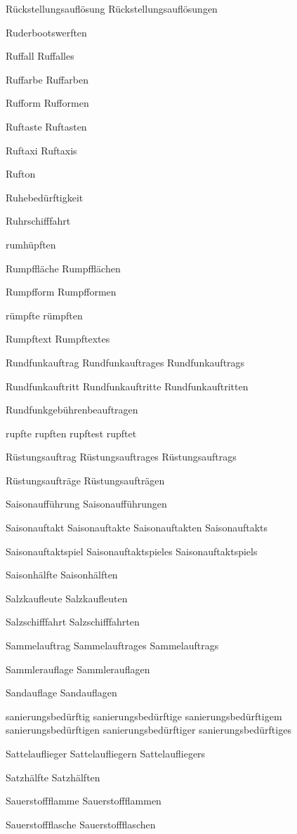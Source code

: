 Rückstellungsauflösung
Rückstellungsauflösungen

Ruderbootswerften

Ruffall
Ruffalles

Ruffarbe
Ruffarben

Rufform
Rufformen

Ruftaste
Ruftasten

Ruftaxi
Ruftaxis

Rufton

Ruhebedürftigkeit

Ruhrschifffahrt

rumhüpften

Rumpffläche
Rumpfflächen

Rumpfform
Rumpfformen

rümpfte
rümpften

Rumpftext
Rumpftextes

Rundfunkauftrag
Rundfunkauftrages
Rundfunkauftrags

Rundfunkauftritt
Rundfunkauftritte
Rundfunkauftritten

Rundfunkgebührenbeauftragen

rupfte
rupften
rupftest
rupftet

Rüstungsauftrag
Rüstungsauftrages
Rüstungsauftrags

Rüstungsaufträge
Rüstungsaufträgen

Saisonaufführung
Saisonaufführungen

Saisonauftakt
Saisonauftakte
Saisonauftakten
Saisonauftakts

Saisonauftaktspiel
Saisonauftaktspieles
Saisonauftaktspiels

Saisonhälfte
Saisonhälften

Salzkaufleute
Salzkaufleuten

Salzschifffahrt
Salzschifffahrten

Sammelauftrag
Sammelauftrages
Sammelauftrags

Sammlerauflage
Sammlerauflagen

Sandauflage
Sandauflagen

sanierungsbedürftig
sanierungsbedürftige
sanierungsbedürftigem
sanierungsbedürftigen
sanierungsbedürftiger
sanierungsbedürftiges

Sattelauflieger
Sattelaufliegern
Sattelaufliegers

Satzhälfte
Satzhälften

Sauerstoffflamme
Sauerstoffflammen

Sauerstoffflasche
Sauerstoffflaschen

